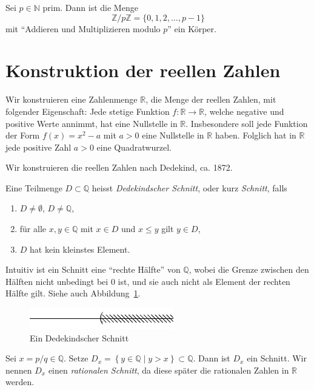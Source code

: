\documentclass[../main.tex]{subfiles}
\begin{document}
\begin{ausblick}[Algebra]
  Sei $p \in \mathbb N$ prim. Dann ist die Menge
  \[ \mathbb Z / p \mathbb Z = \{0, 1, 2, \dots, p-1\}\]
  mit ``Addieren und Multiplizieren modulo $p$'' ein Körper.
\end{ausblick}

\section{Konstruktion der reellen Zahlen}
\begin{goal}
  Wir konstruieren eine Zahlenmenge $\mathbb R$,
  die Menge der reellen Zahlen, mit folgender
  Eigenschaft: Jede stetige Funktion $f \colon \mathbb R \to \mathbb R$,
  welche negative und positive Werte annimmt, hat eine Nullstelle
  in $\mathbb R$. Insbesondere soll jede Funktion
  der Form $f(x)=x^{2}-a$ mit $a>0$ eine Nullstelle in $\mathbb R$
  haben. Folglich hat in $\mathbb R$ jede positive Zahl
  $a > 0$ eine Quadratwurzel.
\end{goal}

Wir konstruieren die reellen Zahlen nach Dedekind, ca. 1872.
\begin{definition}
  Eine Teilmenge $D \subset \mathbb Q$ heisst
  \textit{Dedekindscher Schnitt}, oder kurz \textit{Schnitt},
  falls
  \begin{enumerate}[(1)]
    \item $D \neq \emptyset$, $D \neq \mathbb Q$,
    \item für alle $x, y \in \mathbb Q$ mit $x \in D$ und $x \leq y$ gilt $y \in D$,
    \item $D$ hat kein kleinstes Element.
  \end{enumerate}
\end{definition}

Intuitiv ist ein Schnitt eine ``rechte Hälfte'' von $\mathbb Q$, wobei
die Grenze
zwischen den Hälften
nicht unbedingt bei $0$ ist, und sie auch nicht als Element der
rechten Hälfte gilt. Siehe auch Abbildung~\ref{fig:schnitt}.

\begin{figure}[htb]
  \centering
  \includegraphics{images/dedekind-schnitt}
  \caption{Ein Dedekindscher Schnitt}%
  \label{fig:schnitt}
\end{figure}

\begin{example}
  Sei $x = p/q \in \mathbb Q$. Setze $D_{x} = \left\{y \in \mathbb Q \mid y > x\right\}
  \subset \mathbb Q$.
  Dann ist $D_{x}$ ein Schnitt. Wir nennen $D_{x}$ einen \textit{rationalen Schnitt},
  da diese später die rationalen Zahlen in $\mathbb R$ werden.
\end{example}
\end{document}
